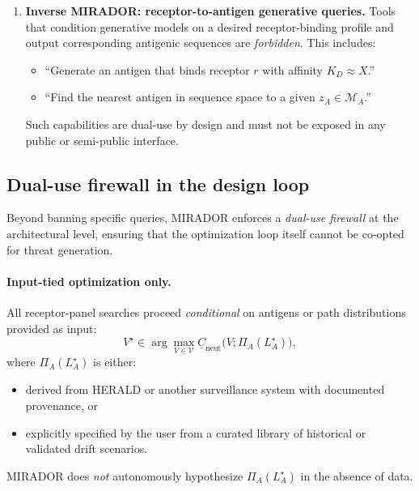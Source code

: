 \documentclass[11pt]{article}
\begin{document}
\begin{enumerate}
  \item \textbf{Inverse MIRADOR: receptor-to-antigen generative queries.}
  Tools that condition generative models on a desired receptor-binding profile and output
  corresponding antigenic sequences are \emph{forbidden}. This includes:
  \begin{itemize}
    \item ``Generate an antigen that binds receptor $r$ with affinity $K_D \approx X$.''
    \item ``Find the nearest antigen in sequence space to a given $z_A \in \mathcal{M}_A$.''
  \end{itemize}
  Such capabilities are dual-use by design and must not be exposed in any public or
  semi-public interface.
\end{enumerate}

\subsection{Dual-use firewall in the design loop}
\label{subsec:design-firewall}

Beyond banning specific queries, MIRADOR enforces a \emph{dual-use firewall} at the
architectural level, ensuring that the optimization loop itself cannot be co-opted for threat
generation.

\paragraph{Input-tied optimization only.}
All receptor-panel searches proceed \emph{conditional} on antigens or path distributions
provided as input:
\begin{equation}
  V^\star \in \arg\max_{V \in \mathcal{V}}
              \underline{C}_{\mathrm{neut}}\bigl(V; \Pi_A(L_A^\star)\bigr),
\end{equation}
where $\Pi_A(L_A^\star)$ is either:
\begin{itemize}
  \item derived from HERALD or another surveillance system with documented provenance, or
  \item explicitly specified by the user from a curated library of historical or validated
        drift scenarios.
\end{itemize}
MIRADOR does \emph{not} autonomously hypothesize $\Pi_A(L_A^\star)$ in the absence of data.
\end{document}
